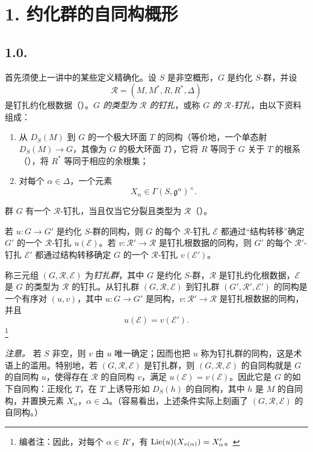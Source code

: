 \section*{1. 约化群的自同构概形}
\subsection*{1.0.}
首先须使上一讲中的某些定义精确化。设 \(S\) 是非空概形，\(G\) 是约化 \(S\)-群，并设
\[
  \mathscr R=(M,M^*,R,R^*,\Delta)
\]
是钉扎约化根数据（）。\emph{\(G\) 的类型为 \(\mathscr R\) 的钉扎}，或称 \emph{\(G\) 的 \(\mathscr R\)-钉扎}，由以下资料组成：
\begin{enumerate}
\item[(i)] 从 \(D_S(M)\) 到 \(G\) 的一个极大环面 \(T\) 的同构（等价地，一个单态射 \(D_S(M)\to G\)，其像为 \(G\) 的极大环面 \(T\)），它将 \(R\) 等同于 \(G\) 关于 \(T\) 的根系（），将 \(R^*\) 等同于相应的余根集；
\item[(ii)] 对每个 \(\alpha\in\Delta\)，一个元素
  \[
    X_\alpha\in\Gamma(S,\mathfrak g^\alpha)^\times.
  \]
\end{enumerate}
群 \(G\) 有一个 \(\mathscr R\)-钉扎，当且仅当它分裂且类型为 \(\mathscr R\)（）。

若 \(u:G\to G'\) 是约化 \(S\)-群的同构，则 \(G\) 的每个 \(\mathscr R\)-钉扎 \(\mathcal E\) 都通过“结构转移”确定 \(G'\) 的一个 \(\mathscr R\)-钉扎 \(u(\mathcal E)\)。若 \(v:\mathscr R'\to\mathscr R\) 是钉扎根数据的同构，则 \(G'\) 的每个 \(\mathscr R'\)-钉扎 \(\mathcal E'\) 都通过结构转移确定 \(G\) 的一个 \(\mathscr R\)-钉扎 \(v(\mathcal E')\)。

称三元组 \((G,\mathscr R,\mathcal E)\) 为\emph{钉扎群}，其中 \(G\) 是约化 \(S\)-群，\(\mathscr R\) 是钉扎约化根数据，\(\mathcal E\) 是 \(G\) 的类型为 \(\mathscr R\) 的钉扎。从钉扎群 \((G,\mathscr R,\mathcal E)\) 到钉扎群 \((G',\mathscr R',\mathcal E')\) 的同构是一个有序对 \((u,v)\)，其中 \(u:G\to G'\) 是同构，\(v:\mathscr R'\to\mathscr R\) 是钉扎根数据的同构，并且
\[
  u(\mathcal E)=v(\mathcal E').
\]
\footnote{编者注：因此，对每个 \(\alpha\in R'\)，有 \(\operatorname{Lie}(u)(X_{v(\alpha)})=X'_\alpha\)。}

\textit{注意。} 若 \(S\) 非空，则 \(v\) 由 \(u\) 唯一确定；因而也把 \(u\) 称为钉扎群的同构，这是术语上的滥用。特别地，若 \((G,\mathscr R,\mathcal E)\) 是钉扎群，则 \((G,\mathscr R,\mathcal E)\) 的自同构就是 \(G\) 的自同构 \(u\)，使得存在 \(\mathscr R\) 的自同构 \(v\)，满足 \(u(\mathcal E)=v(\mathcal E)\)。因此它是 \(G\) 的如下自同构：正规化 \(T\)，在 \(T\) 上诱导形如 \(D_S(h)\) 的自同构，其中 \(h\) 是 \(M\) 的自同构，并置换元素 \(X_\alpha\)，\(\alpha\in\Delta\)。（容易看出，上述条件实际上刻画了 \((G,\mathscr R,\mathcal E)\) 的自同构。）


